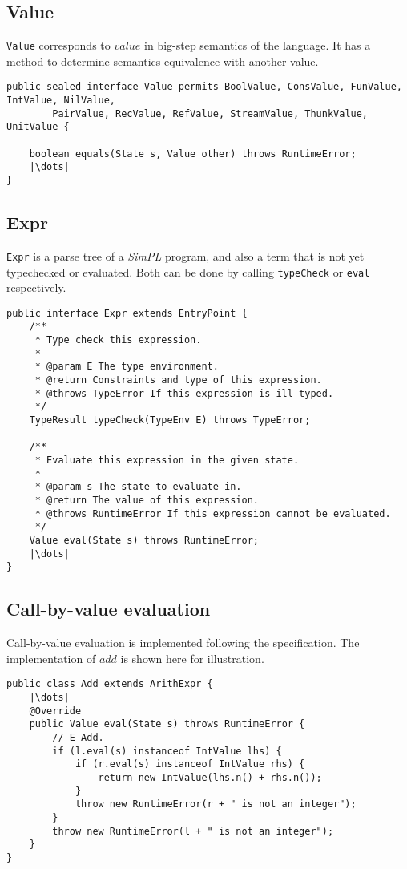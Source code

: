 \documentclass[a4paper]{article}
\begin{document}
\subsection{Value}
\texttt{Value} corresponds to $value$ in big-step semantics of the language. It has a method to determine semantics equivalence with another value.

\begin{verbatim}
public sealed interface Value permits BoolValue, ConsValue, FunValue, IntValue, NilValue, 
        PairValue, RecValue, RefValue, StreamValue, ThunkValue, UnitValue {

    boolean equals(State s, Value other) throws RuntimeError;
    |\dots|
}
\end{verbatim}

\subsection{Expr}
\texttt{Expr} is a parse tree of a \textit{SimPL} program, and also a term that is not yet typechecked or evaluated. Both can be done by calling \texttt{typeCheck} or \texttt{eval} respectively.

\begin{verbatim}
public interface Expr extends EntryPoint {
    /**
     * Type check this expression.
     *
     * @param E The type environment.
     * @return Constraints and type of this expression.
     * @throws TypeError If this expression is ill-typed.
     */
    TypeResult typeCheck(TypeEnv E) throws TypeError;

    /**
     * Evaluate this expression in the given state.
     *
     * @param s The state to evaluate in.
     * @return The value of this expression.
     * @throws RuntimeError If this expression cannot be evaluated.
     */
    Value eval(State s) throws RuntimeError;
    |\dots|
}
\end{verbatim}

\subsection{Call-by-value evaluation}

Call-by-value evaluation is implemented following the specification. The implementation of $add$ is shown here for illustration.

\begin{verbatim}
public class Add extends ArithExpr {
    |\dots|
    @Override
    public Value eval(State s) throws RuntimeError {
        // E-Add.
        if (l.eval(s) instanceof IntValue lhs) {
            if (r.eval(s) instanceof IntValue rhs) {
                return new IntValue(lhs.n() + rhs.n());
            }
            throw new RuntimeError(r + " is not an integer");
        }
        throw new RuntimeError(l + " is not an integer");
    }
}
\end{verbatim}
\end{document}
